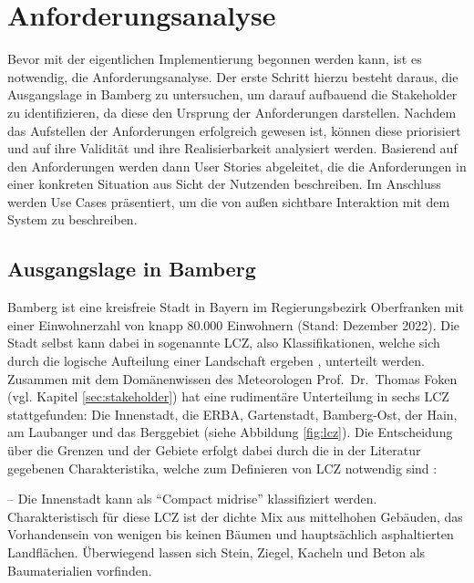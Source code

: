 \chapter{Anforderungsanalyse}
\label{sec:requirements}
Bevor mit der eigentlichen Implementierung begonnen werden kann, ist es notwendig, die Anforderungsanalyse. Der erste Schritt hierzu besteht daraus, die Ausgangslage in Bamberg zu untersuchen, um darauf aufbauend die Stakeholder zu identifizieren, da diese den Ursprung der Anforderungen darstellen. Nachdem das Aufstellen der Anforderungen erfolgreich gewesen ist, können diese priorisiert und auf ihre Validität und ihre Realisierbarkeit analysiert werden. Basierend auf den Anforderungen werden dann User Stories abgeleitet, die die Anforderungen in einer konkreten Situation aus Sicht der Nutzenden beschreiben. Im Anschluss werden Use Cases präsentiert, um die von außen sichtbare Interaktion mit dem System zu beschreiben.

\section{Ausgangslage in Bamberg}
\label{sec:ausgangslage}
Bamberg ist eine kreisfreie Stadt in Bayern im Regierungsbezirk Oberfranken mit einer Einwohnerzahl von knapp 80.000 Einwohnern (Stand: Dezember 2022). Die Stadt selbst kann dabei in sogenannte \ac{LCZ}, also Klassifikationen, welche sich durch die logische Aufteilung einer Landschaft ergeben \cite{stewart2011local}, unterteilt werden. Zusammen mit dem Domänenwissen des Meteorologen Prof.\ Dr.\ Thomas Foken (vgl. Kapitel \ref{sec:stakeholder}) hat eine rudimentäre Unterteilung in sechs \ac{LCZ} stattgefunden: Die Innenstadt, die ERBA, Gartenstadt, Bamberg-Ost, der Hain, am Laubanger und das Berggebiet (siehe Abbildung \ref{fig:lcz}). Die Entscheidung über die Grenzen und der Gebiete erfolgt dabei durch die in der Literatur gegebenen Charakteristika, welche zum Definieren von \ac{LCZ} notwendig sind \cite{oke2004initial, stewart2012local}:

 -- Die Innenstadt kann als \enquote{Compact midrise} klassifiziert werden. Charakteristisch für diese \ac{LCZ} ist der dichte Mix aus mittelhohen Gebäuden, das Vorhandensein von wenigen bis keinen Bäumen und hauptsächlich asphaltierten Landflächen. Überwiegend lassen sich Stein, Ziegel, Kacheln und Beton als Baumaterialien vorfinden.

